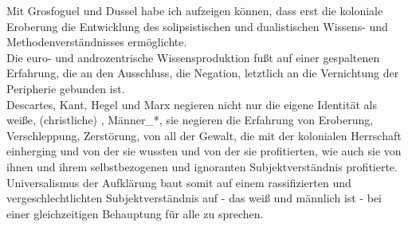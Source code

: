 \noindent Mit Grosfoguel und Dussel habe ich aufzeigen können, dass erst die koloniale
Eroberung die Entwicklung des solipsistischen und dualistischen Wissens- und
Methodenverständnisses ermöglichte. \\
Die euro- und androzentrische
Wissensproduktion fußt auf einer gespaltenen Erfahrung, die an den Ausschluss,
die Negation, letztlich an die Vernichtung der Peripherie gebunden ist.\\
Descartes, Kant, Hegel und Marx negieren nicht nur die eigene Identität als
weiße, (christliche) \footnotemark {} , Männer\_*, sie
negieren die Erfahrung von Eroberung, Verschleppung, Zerstörung, von all der
Gewalt, die mit der kolonialen Herrschaft einherging und von der sie wussten
und von der sie profitierten, wie auch sie von ihnen und ihrem selbstbezogenen
und ignoranten Subjektverständnis profitierte. \\
Universalismus der Aufklärung
baut somit auf einem rassifizierten und vergeschlechtlichten Subjektverständnis
auf - das weiß und männlich ist - bei einer gleichzeitigen Behauptung für alle
zu sprechen.
